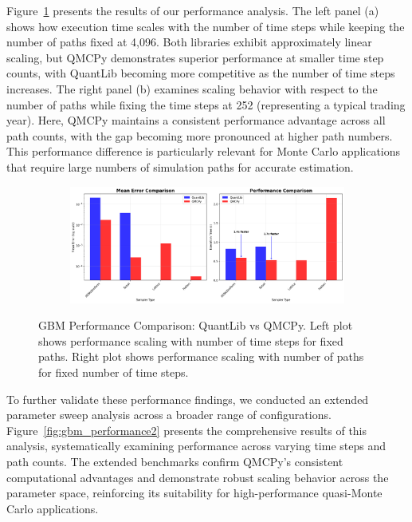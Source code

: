 \documentclass{article}
\begin{document}
Figure~\ref{fig:gbm_performance} presents the results of our performance analysis. The left panel (a) shows how execution time scales with the number of time steps while keeping the number of paths fixed at 4,096. Both libraries exhibit approximately linear scaling, but QMCPy demonstrates superior performance at smaller time step counts, with QuantLib becoming more competitive as the number of time steps increases. The right panel (b) examines scaling behavior with respect to the number of paths while fixing the time steps at 252 (representing a typical trading year). Here, QMCPy maintains a consistent performance advantage across all path counts, with the gap becoming more pronounced at higher path numbers. This performance difference is particularly relevant for Monte Carlo applications that require large numbers of simulation paths for accurate estimation.

\begin{figure}[H]
    \centering
    \begin{subfigure}{1\textwidth}
        \centering
        \includegraphics[width=\textwidth]{images/figure_6.png}
    \end{subfigure}
    \caption{GBM Performance Comparison: QuantLib vs QMCPy. Left plot shows performance scaling with number of time steps for fixed paths. Right plot shows performance scaling with number of paths for fixed number of time steps.}
    \label{fig:gbm_performance}
\end{figure}

To further validate these performance findings, we conducted an extended parameter sweep analysis across a broader range of configurations. Figure~\ref{fig:gbm_performance2} presents the comprehensive results of this analysis, systematically examining performance across varying time steps and path counts. The extended benchmarks confirm QMCPy's consistent computational advantages and demonstrate robust scaling behavior across the parameter space, reinforcing its suitability for high-performance quasi-Monte Carlo applications.
\end{document}
